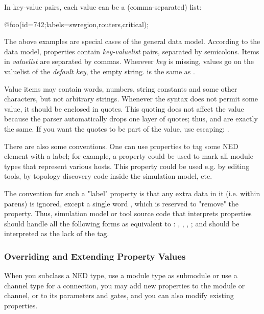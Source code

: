 In key-value pairs, each value can be a (comma-separated) list:

\begin{ned}
@foo(id=742;labels=swregion,routers,critical);
\end{ned}

The above examples are special cases of the general data model. According
to the data model, properties contain \textit{key-valuelist} pairs,
separated by semicolons. Items in \textit{valuelist} are separated by
commas. Wherever \textit{key} is missing, values go on the valuelist of the
\textit{default key}, the empty string.  is the same
as .

Value items may contain words, numbers, string constants and some other
characters, but not arbitrary strings.
Whenever the syntax does not permit some value, it should be enclosed in
quotes. This quoting does not affect the value because
the parser automatically drops one layer of quotes; thus, 
and  are exactly the same. If you want the quotes
to be part of the value, use escaping:
.

There are also some conventions. One can use properties to tag some NED element
with a label; for example, a  property could be used to mark
all module types that represent various hosts. This property could be used
e.g. by editing tools, by topology discovery code inside the simulation model, etc.

The convention for such a "label" property is that any extra data in it
(i.e. within parens) is ignored, except a single word , which is
reserved to "remove" the property. Thus, simulation model or tool source
code that interprets properties should handle all the following forms as
equivalent to : , ,
, ; and
 should be interpreted as the lack of the 
tag.


\subsubsection{Overriding and Extending Property Values}

When you subclass a NED type, use a module type as submodule or use a channel
type for a connection, you may add new properties to the module or channel,
or to its parameters and gates, and you can also modify existing properties.

